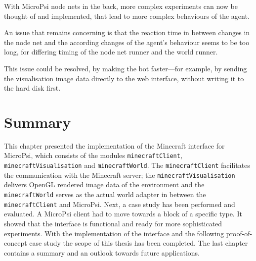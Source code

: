 With MicroPsi node nets in the back, more complex experiments can now be thought of and implemented, that lead to more complex behaviours of the agent.

An issue that remains concerning is that the reaction time in between changes in the node net and the according changes of the agent's behaviour seems to be too long, for differing timing of the node net runner and the world runner.

This issue could be resolved, by making the bot faster---for example, by sending the visualisation image data directly to the web interface, without writing it to the hard disk first.

    \section{Summary}
This chapter presented the implementation of the Minecraft interface for MicroPsi, which consists of the modules \texttt{minecraftClient}, \texttt{minecraftVisualisation} and \texttt{minecraftWorld}. The \texttt{minecraftClient} facilitates the communication with the Minecraft server; the \texttt{minecraftVisualisation} delivers OpenGL rendered image data of the environment and the \texttt{minecraftWorld} serves as the actual world adapter in between the \texttt{minecraftClient} and MicroPsi.
Next, a case study has been performed and evaluated. A MicroPsi client had to move towards a block of a specific type. It showed that the interface is functional and ready for more sophisticated experiments.
With the implementation of the interface and the following proof-of-concept case study the scope of this thesis has been completed. The last chapter contains a summary and an outlook towards future applications.